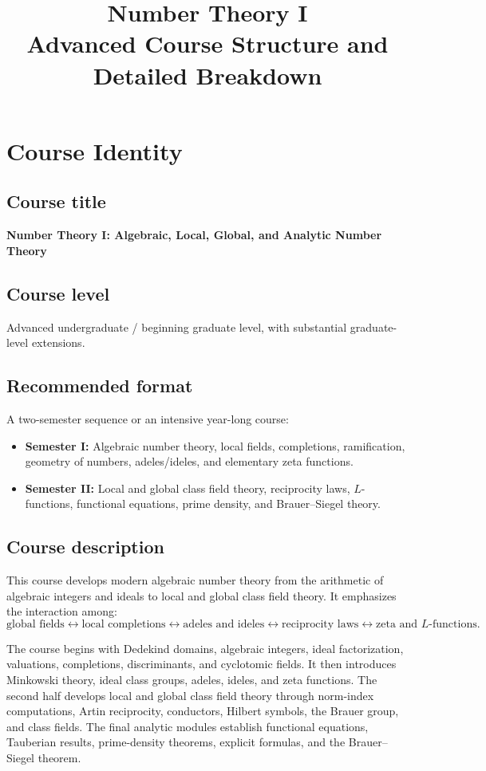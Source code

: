 \documentclass[11pt]{article}
\title{\textbf{Number Theory I}\\
Advanced Course Structure and Detailed Breakdown}
\author{}
\date{}
\begin{document}
\maketitle

\section{Course Identity}

\subsection*{Course title}
\textbf{Number Theory I: Algebraic, Local, Global, and Analytic Number Theory}

\subsection*{Course level}
Advanced undergraduate / beginning graduate level, with substantial graduate-level extensions.

\subsection*{Recommended format}
A two-semester sequence or an intensive year-long course:
\begin{itemize}
    \item \textbf{Semester I:} Algebraic number theory, local fields, completions, ramification, geometry of numbers, adeles/ideles, and elementary zeta functions.
    \item \textbf{Semester II:} Local and global class field theory, reciprocity laws, $L$-functions, functional equations, prime density, and Brauer--Siegel theory.
\end{itemize}

\subsection*{Course description}
This course develops modern algebraic number theory from the arithmetic of algebraic integers and ideals to local and global class field theory. It emphasizes the interaction among:
\[
\text{global fields}
\longleftrightarrow
\text{local completions}
\longleftrightarrow
\text{adeles and ideles}
\longleftrightarrow
\text{reciprocity laws}
\longleftrightarrow
\text{zeta and }L\text{-functions}.
\]

The course begins with Dedekind domains, algebraic integers, ideal factorization, valuations, completions, discriminants, and cyclotomic fields. It then introduces Minkowski theory, ideal class groups, adeles, ideles, and zeta functions. The second half develops local and global class field theory through norm-index computations, Artin reciprocity, conductors, Hilbert symbols, the Brauer group, and class fields. The final analytic modules establish functional equations, Tauberian results, prime-density theorems, explicit formulas, and the Brauer--Siegel theorem.
\end{document}
